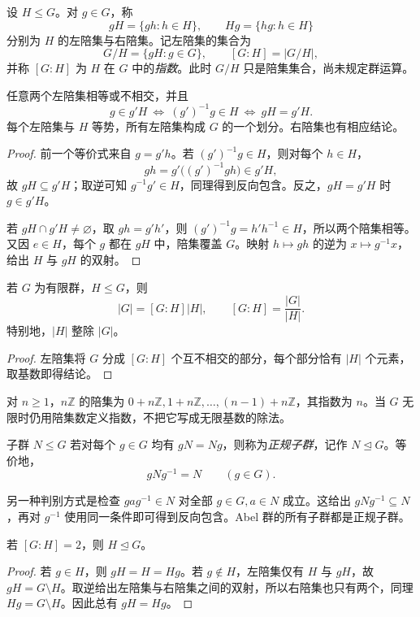 \documentclass[lang=cn,a4paper,fontset=none,zihao=false,10pt,openany,twoside]{beautybook}
\numberwithin{algorithm}{chapter}
\begin{document}
\begin{definition}[陪集与指数]
设 $H\le G$。对 $g\in G$，称
\[
 gH=\{gh:h\in H\},\qquad Hg=\{hg:h\in H\}
\]
分别为 $H$ 的左陪集与右陪集。记左陪集的集合为
\[
 G/H=\{gH:g\in G\},\qquad [G:H]=|G/H|,
\]
并称 $[G:H]$ 为 $H$ 在 $G$ 中的\emph{指数}。此时 $G/H$ 只是陪集集合，尚未规定群运算。
\end{definition}
\begin{proposition}[陪集划分]\label{prop:coset-partition}
任意两个左陪集相等或不相交，并且
\[
 g\in g'H\ \Longleftrightarrow\ (g')^{-1}g\in H
 \ \Longleftrightarrow\ gH=g'H.
\]
每个左陪集与 $H$ 等势，所有左陪集构成 $G$ 的一个划分。右陪集也有相应结论。
\end{proposition}
\begin{proof}
前一个等价式来自 $g=g'h$。若 $(g')^{-1}g\in H$，则对每个 $h\in H$，
\[
 gh=g'\bigl((g')^{-1}gh\bigr)\in g'H,
\]
故 $gH\subseteq g'H$；取逆可知 $g^{-1}g'\in H$，同理得到反向包含。反之，$gH=g'H$ 时 $g\in g'H$。

若 $gH\cap g'H\ne\varnothing$，取 $gh=g'h'$，则 $(g')^{-1}g=h'h^{-1}\in H$，所以两个陪集相等。又因 $e\in H$，每个 $g$ 都在 $gH$ 中，陪集覆盖 $G$。映射 $h\mapsto gh$ 的逆为 $x\mapsto g^{-1}x$，给出 $H$ 与 $gH$ 的双射。
\end{proof}
\begin{theorem}[Lagrange 定理]\label{thm:lagrange}
若 $G$ 为有限群，$H\le G$，则
\[
 |G|=[G:H]|H|,\qquad [G:H]=\frac{|G|}{|H|}.
\]
特别地，$|H|$ 整除 $|G|$。
\end{theorem}
\begin{proof}
左陪集将 $G$ 分成 $[G:H]$ 个互不相交的部分，每个部分恰有 $|H|$ 个元素，取基数即得结论。
\end{proof}
对 $n\ge1$，$n\mathbb Z$ 的陪集为 $0+n\mathbb Z,1+n\mathbb Z,\ldots,(n-1)+n\mathbb Z$，其指数为 $n$。当 $G$ 无限时仍用陪集数定义指数，不把它写成无限基数的除法。

\begin{definition}[正规子群]
子群 $N\le G$ 若对每个 $g\in G$ 均有 $gN=Ng$，则称为\emph{正规子群}，记作 $N\trianglelefteq G$。等价地，
\[
 gNg^{-1}=N\qquad(g\in G).
\]
\end{definition}
另一种判别方式是检查 $gag^{-1}\in N$ 对全部 $g\in G,a\in N$ 成立。这给出 $gNg^{-1}\subseteq N$，再对 $g^{-1}$ 使用同一条件即可得到反向包含。Abel 群的所有子群都是正规子群。
\begin{proposition}[指数为二的子群]
若 $[G:H]=2$，则 $H\trianglelefteq G$。
\end{proposition}
\begin{proof}
若 $g\in H$，则 $gH=H=Hg$。若 $g\notin H$，左陪集仅有 $H$ 与 $gH$，故 $gH=G\setminus H$。取逆给出左陪集与右陪集之间的双射，所以右陪集也只有两个，同理 $Hg=G\setminus H$。因此总有 $gH=Hg$。
\end{proof}
\end{document}
